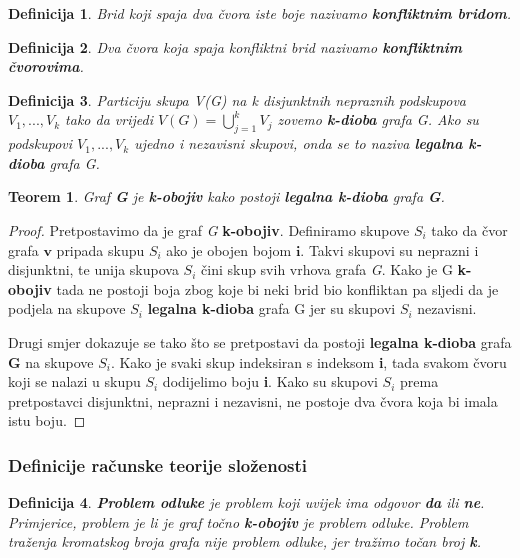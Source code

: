 \documentclass[times, utf8, diplomski, numeric]{fer}
\newtheorem{definition}{Definicija}
\newtheorem{theorem}{Teorem}
\begin{document}
\begin{definition}
Brid koji spaja dva čvora iste boje nazivamo \textbf{konfliktnim bridom}.
\end{definition}

\begin{definition}
Dva čvora koja spaja konfliktni brid nazivamo \textbf{konfliktnim čvorovima}.
\end{definition}

\begin{definition}
Particiju skupa V(G) na k disjunktnih nepraznih podskupova $V_1,..., V_k$
 tako da vrijedi $V(G) = \bigcup_{j=1}^{k}V_j$ zovemo \textbf{k-dioba} grafa G. Ako su podskupovi  $V_1 ,..., V_k$  ujedno i nezavisni skupovi, onda se to naziva \textbf{legalna k-dioba} grafa G.
\end{definition}

\begin{theorem}
\label{thm:dioba}
Graf \textbf{G} je \textbf{k-obojiv} kako postoji \textbf{legalna k-dioba} grafa \textbf{G}.
\end{theorem}

\begin{proof}
Pretpostavimo da je graf \emph{G} \textbf{k-obojiv}. Definiramo skupove $S_i$ tako da čvor grafa $\mathbf{v}$ pripada skupu $S_i$ ako je obojen bojom $\mathbf{i}$. Takvi skupovi su neprazni i disjunktni, te unija skupova $S_i$ čini skup svih vrhova grafa \emph{G}. Kako je G \textbf{k-obojiv} tada ne postoji boja zbog koje bi neki brid bio konfliktan pa sljedi da je podjela na skupove $S_i$ \textbf{legalna k-dioba} grafa G jer su skupovi $S_i$ nezavisni. 

Drugi smjer dokazuje se tako što se pretpostavi da postoji \textbf{legalna k-dioba} grafa \textbf{G} na skupove $S_i$. Kako je svaki skup indeksiran s indeksom \textbf{i}, tada svakom čvoru koji se nalazi u skupu $S_i$ dodijelimo boju \textbf{i}. Kako su skupovi $S_i$ prema pretpostavci disjunktni, neprazni i nezavisni, ne postoje dva čvora koja bi imala istu boju.
\end{proof}

\subsubsection{Definicije računske teorije složenosti}

\begin{definition}
\textbf{Problem odluke} je problem koji uvijek ima odgovor \textbf{da} ili \textbf{ne}. Primjerice, problem je li je graf točno \textbf{k-obojiv} je problem odluke. Problem traženja kromatskog broja grafa nije problem odluke, jer tražimo točan broj \textbf{k}.
\end{definition}
\end{document}
